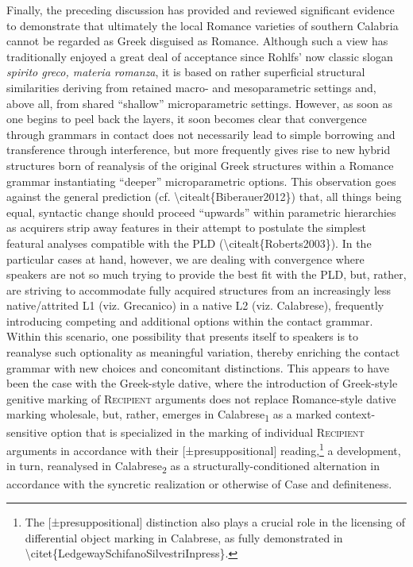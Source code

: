 \documentclass[output=paper,modfonts,nonflat]{langsci/langscibook}
\begin{document}
\begin{styleStandard}
Finally, the preceding discussion has provided and reviewed significant evidence to demonstrate that ultimately the local Romance varieties of southern Calabria cannot be regarded as Greek disguised as Romance. Although such a view has traditionally enjoyed a great deal of acceptance since Rohlfs’ now classic slogan \textit{spirito greco, materia romanza}, it is based on rather superficial structural similarities deriving from retained macro- and mesoparametric settings and, above all, from shared “shallow” microparametric settings. However, as soon as one begins to peel back the layers, it soon becomes clear that convergence through grammars in contact does not necessarily lead to simple borrowing and transference through interference, but more frequently gives rise to new hybrid structures born of reanalysis of the original Greek structures within a Romance grammar instantiating “deeper” microparametric options. This observation goes against the general prediction (cf. {\textbackslash}citealt\{Biberauer2012\}) that, all things being equal, syntactic change should proceed “upwards” within parametric hierarchies as acquirers strip away features in their attempt to postulate the simplest featural analyses compatible with the PLD ({\textbackslash}citealt\{Roberts2003\}). In the particular cases at hand, however, we are dealing with convergence where speakers are not so much trying to provide the best fit with the PLD, but, rather, are striving to accommodate fully acquired structures from an increasingly less native/attrited L1 (viz. Grecanico) in a native L2 (viz. Calabrese), frequently introducing competing and additional options within the contact grammar. Within this scenario, one possibility that presents itself to speakers is to reanalyse such optionality as meaningful variation, thereby enriching the contact grammar with new choices and concomitant distinctions. This appears to have been the case with the Greek-style dative, where the introduction of Greek-style genitive marking of R\textsc{ecipient} arguments does not replace Romance-style dative marking wholesale, but, rather, emerges in Calabrese\textsubscript{1} as a marked context-sensitive option that is specialized in the marking of individual \textsc{Recipient} arguments in accordance with their [±presuppositional] reading,\footnote{ The [±presuppositional] distinction also plays a crucial role in the licensing of differential object marking in Calabrese, as fully demonstrated in {\textbackslash}citet\{LedgewaySchifanoSilvestriInpress\}.} a development, in turn, reanalysed in Calabrese\textsubscript{2} as a structurally-conditioned alternation in accordance with the syncretic realization or otherwise of Case and definiteness.
\end{styleStandard}

\sloppy
\printbibliography[heading=subbibliography,notkeyword=this] 
\end{document}
